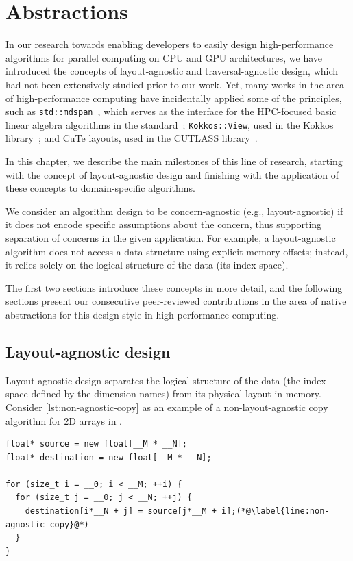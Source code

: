 \chapter{Abstractions}\label{chap:abstractions}

In our research towards enabling developers to easily design high-performance algorithms for parallel computing on CPU and GPU architectures, we have introduced the concepts of layout-agnostic and traversal-agnostic design, which had not been extensively studied prior to our work. Yet, many works in the area of high-performance computing have incidentally applied some of the principles, such as \cpp \lstinline{std::mdspan}~\cite{trott2022mdspan}, which serves as the interface for the HPC-focused basic linear algebra algorithms in the \cpptwentysix standard~\cite{hoemmen2023linalg}; \lstinline{Kokkos::View}, used in the Kokkos library~\cite{trott2021kokkos}; and CuTe layouts, used in the CUTLASS library~\cite{thakkar2023cutlass}.

In this chapter, we describe the main milestones of this line of research, starting with the concept of layout-agnostic design and finishing with the application of these concepts to domain-specific algorithms.

We consider an algorithm design to be concern-agnostic (e.g., layout-agnostic) if it does not encode specific assumptions about the concern, thus supporting separation of concerns in the given application. For example, a layout-agnostic algorithm does not access a data structure using explicit memory offsets; instead, it relies solely on the logical structure of the data (its index space).

The first two sections introduce these concepts in more detail, and the following sections present our consecutive peer-reviewed contributions in the area of native abstractions for this design style in high-performance computing.


\section{Layout-agnostic design}\label{sec:layout-agnostic-design}

Layout-agnostic design separates the logical structure of the data (the index space defined by the dimension names) from its physical layout in memory. Consider \cref{lst:non-agnostic-copy} as an example of a non-layout-agnostic copy algorithm for 2D arrays in \cpp.

\begin{lstlisting}[style=C++, caption={A non-layout-agnostic copy algorithm in \cpp}, label={lst:non-agnostic-copy}]
float* source = new float[__M * __N];
float* destination = new float[__M * __N];

for (size_t i = __0; i < __M; ++i) {
  for (size_t j = __0; j < __N; ++j) {
    destination[i*__N + j] = source[j*__M + i];(*@\label{line:non-agnostic-copy}@*)
  }
}
\end{lstlisting}

